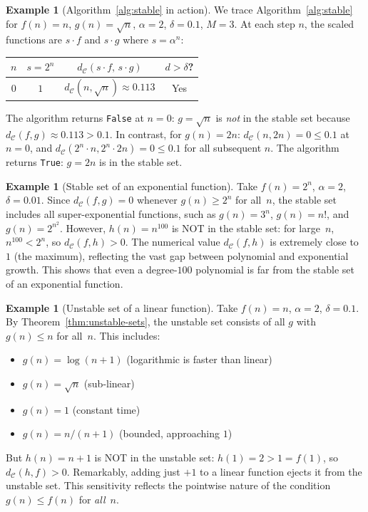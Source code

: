 \documentclass[11pt,a4paper]{article}
\theoremstyle{plain}
\theoremstyle{definition}
\newtheorem{exampleinner}[theoreminner]{Example}
\newenvironment{example}[1][]{\begin{exampleinner}[#1]}{\end{exampleinner}}
\newcommand{\C}{\mathcal{C}}
\begin{document}
\begin{example}[Algorithm~\ref{alg:stable} in action]\label{ex:alg-stable-trace}
We trace Algorithm~\ref{alg:stable} for $f(n)=n$, $g(n)=\sqrt{n}$,
$\alpha=2$, $\delta=0.1$, $M=3$.  At each step $n$, the scaled
functions are $s\cdot f$ and $s\cdot g$ where $s=\alpha^n$:
\begin{center}
\begin{tabular}{cccc}
\hline
$n$ & $s=2^n$ & $d_\C(s\cdot f,\, s\cdot g)$ & $d>\delta$? \\\hline
$0$ & $1$ & $d_\C(n,\sqrt{n})\approx 0.113$ & Yes \\
\hline
\end{tabular}
\end{center}
The algorithm returns \texttt{False} at $n=0$: $g=\sqrt{n}$ is
\emph{not} in the stable set because $d_\C(f,g)\approx 0.113>0.1$.
In contrast, for $g(n)=2n$: $d_\C(n,2n)=0\le 0.1$ at $n=0$, and
$d_\C(2^n \cdot n, 2^n\cdot 2n)=0\le 0.1$ for all subsequent $n$.
The algorithm returns \texttt{True}: $g=2n$ is in the stable set.
\end{example}

\begin{example}[Stable set of an exponential function]\label{ex:stable-exp}
Take $f(n)=2^n$, $\alpha=2$, $\delta=0.01$.  Since $d_\C(f,g)=0$
whenever $g(n)\ge 2^n$ for all~$n$, the stable set includes all
super-exponential functions, such as $g(n)=3^n$, $g(n)=n!$, and
$g(n)=2^{n^2}$.  However, $h(n)=n^{100}$ is NOT in the stable set:
for large~$n$, $n^{100}<2^n$, so $d_\C(f,h)>0$.  The numerical
value $d_\C(f,h)$ is extremely close to~$1$ (the maximum), reflecting
the vast gap between polynomial and exponential growth.  This shows
that even a degree-$100$ polynomial is far from the stable set of an
exponential function.
\end{example}

\begin{example}[Unstable set of a linear function]\label{ex:unstable-linear}
Take $f(n)=n$, $\alpha=2$, $\delta=0.1$.  By
Theorem~\ref{thm:unstable-sets}, the unstable set consists of all
$g$ with $g(n)\le n$ for all~$n$.  This includes:
\begin{itemize}
\item $g(n)=\log(n+1)$ (logarithmic is faster than linear)
\item $g(n)=\sqrt{n}$ (sub-linear)
\item $g(n)=1$ (constant time)
\item $g(n)=n/(n+1)$ (bounded, approaching $1$)
\end{itemize}
But $h(n)=n+1$ is NOT in the unstable set: $h(1)=2>1=f(1)$, so
$d_\C(h,f)>0$.  Remarkably, adding just $+1$ to a linear function
ejects it from the unstable set.  This sensitivity reflects the
pointwise nature of the condition $g(n)\le f(n)$ for \emph{all}~$n$.
\end{example}
\end{document}
